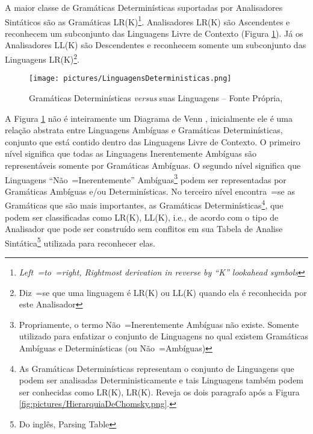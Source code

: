 {    A maior classe de Gramáticas Determinísticas suportadas por Analisadores
    Sintáticos são as Gramáticas LR(K)\footnote{\textit{Left~=to~=right,
    Rightmost derivation in reverse by ``K'' lookahead symbols
    }}.
    Analisadores LR(K) \cite{ahoCompilerDragonBook} são Ascendentes e
    reconhecem um subconjunto das Linguagens Livre de Contexto
    (Figura \ref{fig:pictures/LinguagensDeterministicas.png}).
    Já os Analisadores LL(K) são Descendentes e
    reconhecem somente um subconjunto das Linguagens LR(K)\footnote{Diz~=se que uma
    linguagem é LR(K) ou LL(K) quando ela é reconhecida por este Analisador}.
    \begin{figure}[H]
    \centering
    \texttt{[image: pictures/LinguagensDeterministicas.png]}
    \caption{Gramáticas Determinísticas \textit{versus} suas Linguagens -- Fonte Própria,
    }
    \label{fig:pictures/LinguagensDeterministicas.png}
    \end{figure}

    A Figura \ref{fig:pictures/LinguagensDeterministicas.png} não é
    inteiramente um Diagrama de Venn \cite{generalizedVennDiagrams},
    inicialmente ele é uma relação abstrata entre Linguagens Ambíguas e
    Gramáticas Determinísticas,
    conjunto que está contido dentro das Linguagens Livre de Contexto.
    O primeiro nível significa que todas as Linguagens Inerentemente
    Ambíguas são representáveis somente por Gramáticas Ambíguas.
    O segundo nível significa que Linguagens ``Não~=Inerentemente'' Ambíguas\footnote{Propriamente,
    o termo Não~=Inerentemente Ambíguas não existe.
    Somente utilizado para enfatizar o conjunto de Linguagens no qual existem Gramáticas Ambíguas e
    Determinísticas (ou Não~=Ambíguas)} podem ser representadas
    por Gramáticas Ambíguas e\slash{}ou Determinísticas.
    No terceiro nível encontra~=se as Gramáticas que são mais importantes,
    as Gramáticas Determinísticas\footnote{As Gramáticas Determinísticas representam o
    conjunto de Linguagens que podem ser analisadas Deterministicamente e
    tais Linguagens também podem ser conhecidas como LR(K),
    LR(K).
    Reveja os dois paragrafo após a Figura \ref{fig:pictures/HierarquiaDeChomsky.png}.},
    que podem ser classificadas como LR(K),
    LL(K), i.e.,
    de acordo com o tipo de Analisador que pode ser construído sem
    conflitos em sua Tabela de Analise Sintática\footnote{Do inglês,
    Parsing Table} \cite{ahoCompilerDragonBook} utilizada para reconhecer elas.

}
